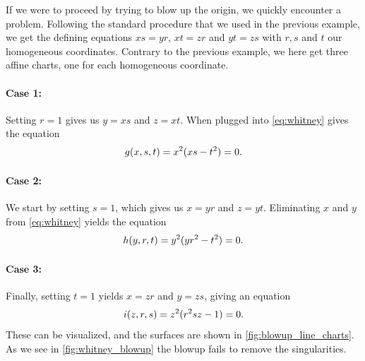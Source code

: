 \documentclass{article}
\begin{document}
    \begin{example}
        If we were to proceed by trying to blow up the origin, we quickly
        encounter a problem. Following the standard procedure that we used in
        the previous example, we get the defining equations $xs = yr$, $xt =
        zr$ and $yt = zs$ with $r, s$ and $t$ our homogeneous coordinates.
        Contrary to the previous example, we here get three affine charts, one
        for each homogeneous coordinate.

        \paragraph{Case 1:}
        Setting $r = 1$ gives us $y = xs$ and $z = xt$. When plugged into
        \cref{eq:whitney} gives the equation
        \begin{equation}
            \notag
            g(x, s, t) = x^2(xs - t^2) = 0.
        \end{equation}
        
        \paragraph{Case 2:}
        We start by setting $s = 1$, which gives us $x = yr$ and $z = yt$.
        Eliminating $x$ and $y$ from \cref{eq:whitney} yields the equation
        \begin{equation}
            \notag
            h(y, r, t) = y^2(yr^2 - t^2) = 0.
        \end{equation}
        
        \paragraph{Case 3:}
        Finally, setting $t = 1$ yields $x = zr$ and $y = zs$, giving an
        equation
        \begin{equation}
            \notag
            i(z, r, s) = z^2(r^2sz - 1) = 0.
        \end{equation}
        These can be visualized, and the surfaces are shown in
        \cref{fig:blowup_line_charts}. As we see in \cref{fig:whitney_blowup} 
        the blowup fails to remove the singularities.


\end{example}
\end{document}
